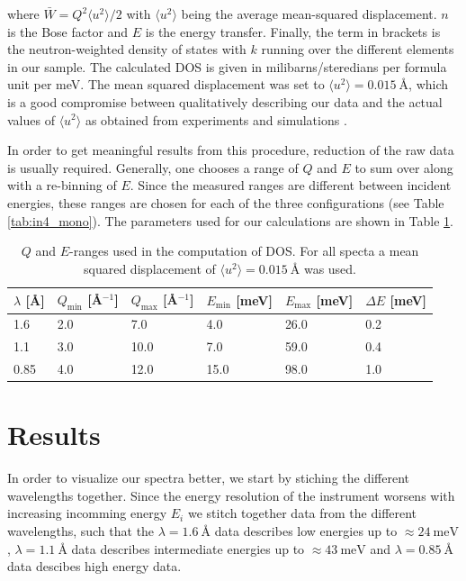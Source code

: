  \noindent where $\bar{W} = Q^2 \langle u^2 \rangle / 2$ with $\langle u^2 \rangle$ being the average mean-squared displacement. $n$ is the Bose factor and $E$ is the energy transfer. Finally, the term in brackets is the neutron-weighted density of states with $k$ running over the different elements in our sample. The calculated DOS is given in milibarns/steredians per formula unit per meV. The mean squared displacement was set to $\langle u^2 \rangle = \SI{0.015}{\angstrom}$, which is a good compromise between qualitatively describing our data and the actual values of $\langle u^2 \rangle$ as obtained from experiments  and simulations .
 
 In order to get meaningful results from this procedure, reduction of the raw data is usually required. Generally, one chooses a range of $Q$ and $E$ to sum over along with a re-binning of $E$. Since the measured ranges are different between incident energies, these ranges are chosen for each of the three configurations (see Table \ref{tab:in4_mono}). The parameters used for our calculations are shown in Table \ref{tab:qeranges}.
 
\begin{table}[b]
   \centering
   \begin{tabular}{llllll}
   \toprule
   $\lambda$ [\AA] & $Q_\text{min}$ [\AA$^{-1}$] & $Q_\text{max}$ [\AA$^{-1}$] & $E_\text{min}$ [meV] & $E_\text{max}$ [meV] & $\Delta E$ [meV] \\ \midrule
   1.6             & 2.0                         & 7.0                         & 4.0                  & 26.0                 & 0.2              \\
   1.1             & 3.0                         & 10.0                        & 7.0                  & 59.0                 & 0.4              \\
   0.85            & 4.0                         & 12.0                        & 15.0                 & 98.0                 & 1.0              \\ \bottomrule
   \end{tabular}
    \caption[IN4: $Q$ and $E$ windows for DOS integration]{$Q$ and $E$-ranges used in the computation of DOS. For all specta a mean squared displacement of $\langle u^2 \rangle = \SI{0.015}{\angstrom}$ was used.}
    \label{tab:qeranges}
\end{table}

\section{Results}
In order to visualize our spectra better, we start by stiching the different wavelengths together. Since the energy resolution of the instrument worsens with increasing incomming energy $E_i$ we stitch together data from the different wavelengths, such that the $\lambda = \SI{1.6}{\angstrom}$ data describes low energies up to $\approx \SI{24}{\milli\electronvolt}$, $\lambda = \SI{1.1}{\angstrom}$ data describes intermediate energies up to $\approx \SI{43}{\milli\electronvolt}$ and $\lambda = \SI{0.85}{\angstrom}$ data descibes high energy data.

